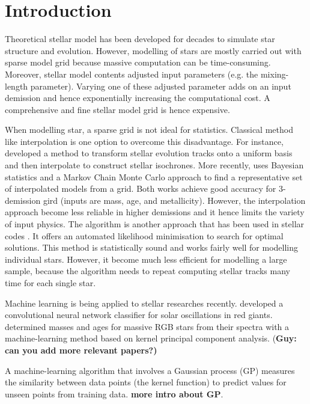 \section{Introduction}

Theoretical stellar model has been developed for decades to simulate star structure and evolution. However, modelling of stars are mostly carried out with sparse model grid \citep[e.g.][]{2016ApJ...823..102C} because massive computation can be time-consuming. Moreover, stellar model contents adjusted input parameters (e.g. the mixing-length parameter). Varying one of these adjusted parameter adds on an input demission and hence exponentially increasing the computational cost. A comprehensive and fine stellar model grid is hence expensive. 

When modelling star, a sparse grid is not ideal for statistics. Classical method like interpolation is one option to overcome this disadvantage. For instance, \citet{2016ApJS..222....8D} developed a method to transform stellar evolution tracks onto a uniform basis and then interpolate to construct stellar isochrones. More recently, \citet{2019MNRAS.484..771R} uses Bayesian statistics and a Markov Chain Monte Carlo approach to find a representative set of interpolated models from a grid. Both works achieve good accuracy for 3-demission gird (inputs are mass, age, and metallicity). However, the interpolation approach become less reliable in higher demissions and it hence limits the variety of input physics. The algorithm is another approach that has been used in stellar codes \citep[e.g.][]{2013ApJS..208....4P}. It offers an automated likelihood minimisation to search for optimal solutions. This method is statistically sound and works fairly well for modelling individual stars. However, it become much less efficient for modelling a large sample, because the algorithm needs to repeat computing stellar tracks many time for each single star.     

Machine learning is being applied to 	stellar researches recently. \citet{2018MNRAS.476.3233H} developed a convolutional neural network classifier for solar oscillations in red giants. \citet{2019MNRAS.484.5315W} determined masses and ages for massive RGB stars from their spectra with a machine-learning method based on kernel principal component analysis.  {(\bf Guy: can you add more relevant papers?)}

A machine-learning algorithm that involves a Gaussian process (GP) measures the similarity between data points (the kernel function) to predict values for unseen points from training data. {\bf more intro about GP}. 

